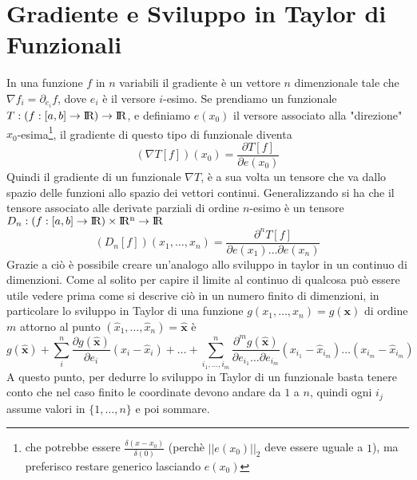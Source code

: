 \documentclass[11pt,a4paper]{article}
\theoremstyle{definition}
\theoremstyle{plain}
\theoremstyle{plain}
\begin{document}
	\section{Gradiente e Sviluppo in Taylor di Funzionali}
		In una funzione $f$ in $n$ variabili il gradiente è un vettore $n$ dimenzionale tale che $\nabla f_i=\partial_{e_i} f$, dove $e_i$ è il versore $i$-esimo.\newline
		Se prendiamo un funzionale $T:(f:[a,b]\rightarrow \rm I\!R)\rightarrow \rm I\!R$, e definiamo $e(x_0)$ il versore associato alla "direzione" $x_0$-esima\footnote{che potrebbe essere $\frac{\delta (x-x_0)}{\delta(0)}$ (perchè $||e(x_0)||_2$ deve essere uguale a $1$), ma preferisco restare generico lasciando $e(x_0)$}, il gradiente di questo tipo di funzionale diventa
		\begin{equation}
			(\nabla T[f])(x_0)=\frac{\partial T[f]}{\partial e(x_0)}
		\end{equation}
		Quindi  il gradiente di un funzionale $\nabla T$, è a sua volta un tensore che va dallo spazio delle funzioni allo spazio dei vettori continui.\newline
		Generalizzando si ha che il tensore associato alle derivate parziali di ordine $n$-esimo è un tensore $D_n:(f:[a,b]\rightarrow \rm I\!R)\times \rm I\!R^n\rightarrow \rm I\!R$
		\begin{equation}
			(D_n[f])(x_1,\dots,x_n)=\frac{\partial^n T[f]}{\partial e(x_1)\dots\partial e(x_n)}
		\end{equation}
		Grazie a ciò è possibile creare un'analogo allo sviluppo in taylor in un continuo di dimenzioni.\newline
		Come al solito per capire il limite al continuo di qualcosa può essere utile vedere prima come si descrive ciò in un numero finito di dimenzioni, in particolare lo sviluppo in Taylor di una funzione $g(x_1,\dots,x_n)=g(\mathbf x)$ di ordine $m$ attorno al punto $(\hat x_1,\dots,\hat x_n)=\mathbf{\hat x}$ è
		\begin{equation}
			g(\mathbf{\hat x})+\sum_{i}^{n}\frac{\partial g(\mathbf{\hat x})}{\partial e_i}(x_i-\hat x_i)+\dots+
			\sum_{i_1,\dots,i_m}^{n}
			\frac{\partial^m g(\mathbf{\hat x})}
			{\partial e_{i_1}\dots\partial e_{i_m}}
			(x_{i_1}-\hat x_{i_m})\dots(x_{i_m}-\hat x_{i_m})
		\end{equation}
		A questo punto, per dedurre lo sviluppo in Taylor di un funzionale basta tenere conto che nel caso finito le coordinate devono andare da $1$ a $n$, quindi ogni $i_j$ assume valori in $\{1,\dots,n\}$ e poi sommare.\newline
\end{document}
